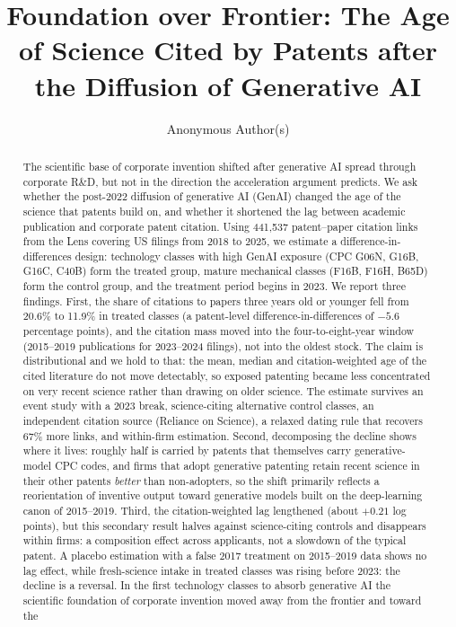 \documentclass[
]{ceurart}
\begin{document}


\title{Foundation over Frontier: The Age of Science Cited by Patents
  after the Diffusion of Generative AI}

\author[1]{Anonymous Author(s)}
\address[1]{Anonymous Institution}

\begin{abstract}
The scientific base of corporate invention shifted after generative AI spread through corporate R\&D, but not in the direction the acceleration argument predicts. We ask whether the post-2022 diffusion of generative AI (GenAI) changed the age of the science that patents build on, and whether it shortened the lag between academic publication and corporate patent citation. Using 441,537 patent--paper citation links from the Lens covering US filings from 2018 to 2025, we estimate a difference-in-differences design: technology classes with high GenAI exposure (CPC G06N, G16B, G16C, C40B) form the treated group, mature mechanical classes (F16B, F16H, B65D) form the control group, and the treatment period begins in 2023. We report three findings. First, the share of citations to papers three years old or younger fell from 20.6\% to 11.9\% in treated classes (a patent-level difference-in-differences of $-5.6$ percentage points), and the citation mass moved into the four-to-eight-year window (2015--2019 publications for 2023--2024 filings), not into the oldest stock. The claim is distributional and we hold to that: the mean, median and citation-weighted age of the cited literature do not move detectably, so exposed patenting became less concentrated on very recent science rather than drawing on older science. The estimate survives an event study with a 2023 break, science-citing alternative control classes, an independent citation source (Reliance on Science), a relaxed dating rule that recovers 67\% more links, and within-firm estimation. Second, decomposing the decline shows where it lives: roughly half is carried by patents that themselves carry generative-model CPC codes, and firms that adopt generative patenting retain recent science in their other patents \emph{better} than non-adopters, so the shift primarily reflects a reorientation of inventive output toward generative models built on the deep-learning canon of 2015--2019. Third, the citation-weighted lag lengthened (about $+0.21$ log points), but this secondary result halves against science-citing controls and disappears within firms: a composition effect across applicants, not a slowdown of the typical patent. A placebo estimation with a false 2017 treatment on 2015--2019 data shows no lag effect, while fresh-science intake in treated classes was rising before 2023: the decline is a reversal. In the first technology classes to absorb generative AI the scientific foundation of corporate invention moved away from the frontier and toward the 
\end{abstract}
\end{document}
